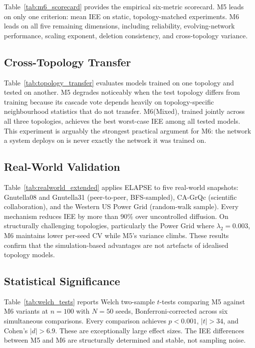 \documentclass[conference]{IEEEtran}
\begin{document}
Table~\ref{tab:m6_scorecard} provides the empirical six-metric scorecard.
  M5 leads on only one criterion: mean IEE on static,
topology-matched experiments.  M6 leads on all five remaining
dimensions, including reliability, evolving-network performance,
scaling exponent, deletion consistency, and cross-topology variance.



\subsection{Cross-Topology Transfer}

Table~\ref{tab:topology_transfer} evaluates models trained on one
topology and tested on another.  M5 degrades noticeably when the
test topology differs from training because its cascade vote depends
heavily on topology-specific neighbourhood statistics that do not
transfer.  M6(Mixed), trained jointly across all three topologies,
achieves the best worst-case IEE among all tested models.  This
experiment is arguably the strongest practical argument for M6: the
network a system deploys on is never exactly the network it was
trained on.



\subsection{Real-World Validation}

Table~\ref{tab:realworld_extended} applies ELAPSE to five real-world
snapshots: Gnutella08 and Gnutella31 (peer-to-peer, BFS-sampled),
CA-GrQc (scientific collaboration), and the Western US Power Grid
(random-walk sample).  Every mechanism reduces IEE by more than
90\% over uncontrolled diffusion.  On structurally challenging
topologies, particularly the Power Grid where $\lambda_2=0.003$, M6
maintains lower per-seed CV while M5's variance climbs.  These
results confirm that the simulation-based advantages are not
artefacts of idealised topology models.



\subsection{Statistical Significance}

Table~\ref{tab:welch_tests} reports Welch two-sample $t$-tests
comparing M5 against M6 variants at $n=100$ with $N=50$ seeds,
Bonferroni-corrected across six simultaneous comparisons.  Every
comparison achieves $p<0.001$, $|t|>34$, and Cohen's $|d|>6.9$.
These are exceptionally large effect sizes.  The IEE differences
between M5 and M6 are structurally determined and stable, not
sampling noise.
\end{document}
